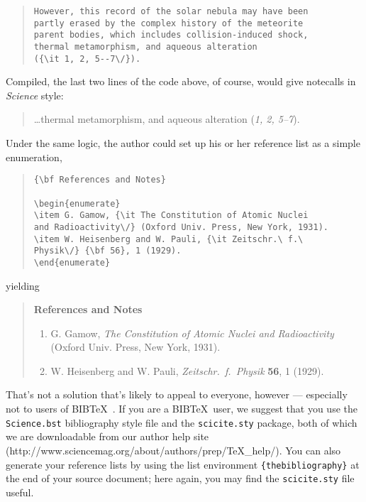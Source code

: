 \documentclass[letterpaper, 12pt]{article}
\begin{document}
{\begin{quote}
\begin{verbatim}
However, this record of the solar nebula may have been
partly erased by the complex history of the meteorite
parent bodies, which includes collision-induced shock,
thermal metamorphism, and aqueous alteration
({\it 1, 2, 5--7\/}).
\end{verbatim}
\end{quote}


\noindent Compiled, the last two lines of the code above, of course, would give notecalls in {\it Science\/} style:

\begin{quote}
\ldots thermal metamorphism, and aqueous alteration ({\it 1, 2, 5--7\/}).
\end{quote}

Under the same logic, the author could set up his or her reference list as a simple enumeration,

\begin{quote}
\begin{verbatim}
{\bf References and Notes}

\begin{enumerate}
\item G. Gamow, {\it The Constitution of Atomic Nuclei
and Radioactivity\/} (Oxford Univ. Press, New York, 1931).
\item W. Heisenberg and W. Pauli, {\it Zeitschr.\ f.\ 
Physik\/} {\bf 56}, 1 (1929).
\end{enumerate}
\end{verbatim}
\end{quote}

\noindent yielding

\begin{quote}
{\bf References and Notes}

\begin{enumerate}
\item G. Gamow, {\it The Constitution of Atomic Nuclei and
Radioactivity\/} (Oxford Univ. Press, New York, 1931).
\item W. Heisenberg and W. Pauli, {\it Zeitschr.\ f.\ Physik} {\bf 56},
1 (1929).
\end{enumerate}
\end{quote}

That's not a solution that's likely to appeal to everyone, however ---
especially not to users of B{\small{IB}}\TeX\ \cite{inclme}.  If you
are a B{\small{IB}}\TeX\ user, we suggest that you use the
\texttt{Science.bst} bibliography style file and the
\texttt{scicite.sty} package, both of which we are downloadable from our author help site
(http://www.sciencemag.org/about/authors/prep/TeX\_help/).  You can also
generate your reference lists by using the list environment
\texttt{\{thebibliography\}} at the end of your source document; here
again, you may find the \texttt{scicite.sty} file useful.

}
\end{document}
